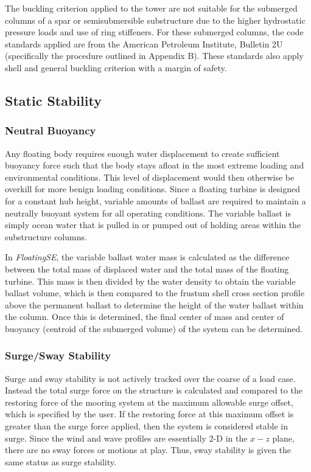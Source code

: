 The buckling criterion applied to the tower are not suitable for the
submerged columns of a spar or semisubmersible substructure due to the
higher hydrostatic pressure loads and use of ring stiffeners.  For these
submerged columns, the code standards applied are from the American
Petroleum Institute, Bulletin 2U \citep{api2U} (specifically the
procedure outlined in Appendix B).  These standards also apply shell and
general buckling criterion with a margin of safety.


\subsection{Static Stability}
\label{sec:static}
\subsubsection{Neutral Buoyancy}
Any floating body requires enough water displacement to create
sufficient buoyancy force such that the body stays afloat in the most
extreme loading and environmental conditions.  This level of
displacement would then otherwise be overkill for more benign loading
conditions.  Since a floating turbine is designed for a constant hub
height, variable amounts of ballast are required to maintain a neutrally
buoyant system for all operating conditions.  The variable ballast is
simply ocean water that is pulled in or pumped out of holding areas
within the substructure columns.

In \textit{FloatingSE}, the variable ballast water mass is calculated as the
difference between the total mass of displaced water and the total mass
of the floating turbine.  This mass is then divided by the water density
to obtain the variable ballast volume, which is then compared to the
frustum shell cross section profile above the permanent ballast to
determine the height of the water ballast within the column.  Once this
is determined, the final center of mass and center of buoyancy (centroid
of the submerged volume) of the
system can be determined.

\subsubsection{Surge/Sway Stability}
Surge and sway stability is not actively tracked over the coarse of a
load case.  Instead the total surge force on the structure is calculated
and compared to the restoring force of the mooring system at the maximum
allowable surge offset, which is specified by the user.  If the
restoring force at this maximum offset is greater than the surge force
applied, then the system is considered stable in surge.  Since the wind
and wave profiles are essentially 2-D in the $x-z$ plane, there are no
sway forces or motions at play.  Thus, sway stability is given the same
status as surge stability.


